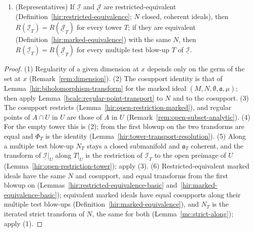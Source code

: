 \begin{proposition}
\begin{enumerate}
(Lemma~\ref{hir:open-restriction-tower}), then \(R((\underline{\mathcal I}|_U)_{T|_U})\) is the trace of \(R(\underline{\mathcal I}_T)\) on the open preimage of \(U\).
\item (Representatives) If \(\underline{\mathcal I}\) and \(\underline{\mathcal J}\) are restricted-equivalent (Definition~\ref{hir:restricted-equivalence}; \(N\) closed, coherent
ideals), then \(R(\underline{\mathcal I}_T)=R(\underline{\mathcal J}_T)\) for every tower \(T\); if they are equivalent (Definition~\ref{hir:marked-equivalence}) with the same \(N\),
then \(R(\underline{\mathcal I}_T)=R(\underline{\mathcal J}_T)\) for every multiple test blow-up \(T\) of \(\underline{\mathcal I}\).
\end{enumerate}
\end{proposition}
\begin{proof}
\mixedleanok
(1) Regularity of a given dimension at \(x\) depends only on the germ of the set at \(x\) (Remark~\ref{rem:dimension}). (2) The cosupport identity is that of
Lemma~\ref{hir:biholomorphism-transform} for the marked ideal \((M,N,\emptyset,\mathfrak a,\mu)\); then apply Lemma~\ref{bcalc:regular-point-transport} to \(N\) and to the
cosupport. (3) The cosupport restricts (Lemma~\ref{hir:open-restriction-marked}), and regular points of \(A\cap U\) in \(U\) are those of \(A\) in \(U\)
(Remark~\ref{rem:open-subset-analytic}). (4) For the empty tower this is (2); from the first blowup on the two transforms are equal and \(\Phi_T\) is the identity
(Lemma~\ref{hir:tower-transport-resolution}). (5) Along a multiple test blow-up \(N_T\) stays a closed submanifold and \(\mathfrak a_T\) coherent, and the transform of
\(\underline{\mathcal I}|_U\) along \(T|_U\) is the restriction of \(\underline{\mathcal I}_T\) to the open preimage of \(U\) (Lemma~\ref{hir:open-restriction-tower}); apply (3).
(6) Restricted-equivalent marked ideals have the same \(N\) and cosupport, and equal transforms from the first blowup on
(Lemmas~\ref{hir:restricted-equivalence-basic} and~\ref{hir:marked-equivalence-basic}); equivalent marked ideals have equal cosupports along their multiple test
blow-ups (Definition~\ref{hir:marked-equivalence}), and \(N_T\) is the iterated strict transform of \(N\), the same for both (Lemma~\ref{mc:strict-along}); apply (1).
\end{proof}

